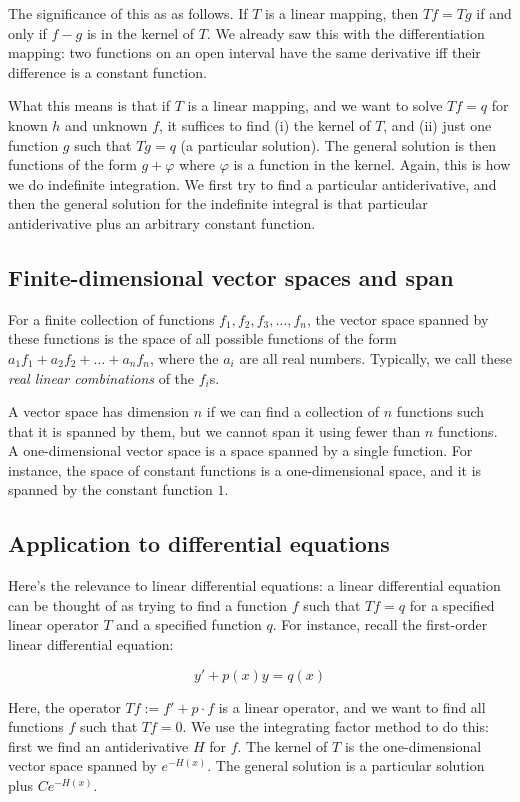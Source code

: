 \documentclass{amsart}
\begin{document}
The significance of this as as follows. If $T$ is a linear mapping,
then $Tf = Tg$ if and only if $f - g$ is in the kernel of $T$. We
already saw this with the differentiation mapping: two functions on an
open interval have the same derivative iff their difference is a
constant function.

What this means is that if $T$ is a linear mapping, and we want to
solve $Tf = q$ for known $h$ and unknown $f$, it suffices to find (i)
the kernel of $T$, and (ii) just one function $g$ such that $Tg = q$
(a particular solution). The general solution is then functions of the
form $g + \varphi$ where $\varphi$ is a function in the kernel. Again, this is how
we do indefinite integration. We first try to find a particular
antiderivative, and then the general solution for the indefinite
integral is that particular antiderivative plus an arbitrary constant
function.

\subsection{Finite-dimensional vector spaces and span}

For a finite collection of functions $f_1, f_2, f_3, \dots, f_n$, the
vector space spanned by these functions is the space of all possible
functions of the form $a_1f_1 + a_2f_2 + \dots + a_nf_n$, where the
$a_i$ are all real numbers. Typically, we call these {\em real linear
combinations} of the $f_i$s.

A vector space has dimension $n$ if we can find a collection of $n$
functions such that it is spanned by them, but we cannot span it using
fewer than $n$ functions. A one-dimensional vector space is a space
spanned by a single function. For instance, the space of constant
functions is a one-dimensional space, and it is spanned by the
constant function $1$.

\subsection{Application to differential equations}

Here's the relevance to linear differential equations: a linear
differential equation can be thought of as trying to find a function
$f$ such that $Tf = q$ for a specified linear operator $T$ and a
specified function $q$. For instance, recall the first-order linear
differential equation:

$$y' + p(x)y = q(x)$$

Here, the operator $Tf := f' + p\cdot f$ is a linear operator, and we
want to find all functions $f$ such that $Tf = 0$. We use the
integrating factor method to do this: first we find an antiderivative
$H$ for $f$. The kernel of $T$ is the one-dimensional vector space
spanned by $e^{-H(x)}$. The general solution is a particular solution
plus $Ce^{-H(x)}$.
\end{document}
